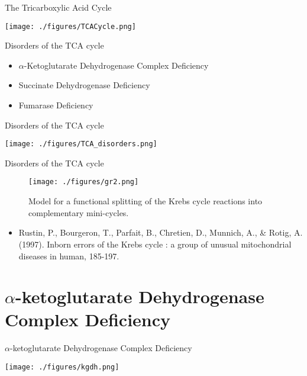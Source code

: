 \documentclass[presentation, smaller]{beamer}
\begin{document}
\begin{frame}[label={sec:org8dd6560}]{The Tricarboxylic Acid Cycle}
\begin{center}
\texttt{[image: ./figures/TCACycle.png]}
\end{center}

\centering
\tiny
{}
\end{frame}

\begin{frame}[label={sec:orgdf7a804}]{Disorders of the TCA cycle}
\begin{itemize}
\item \(\alpha\)-Ketoglutarate Dehydrogenase Complex Deficiency
\item Succinate Dehydrogenase Deficiency
\item Fumarase Deficiency
\end{itemize}
\end{frame}

\begin{frame}[label={sec:org1478622}]{Disorders of the TCA cycle}
\begin{center}
\texttt{[image: ./figures/TCA\_disorders.png]}
\end{center}
\end{frame}


\begin{frame}[label={sec:org9564000}]{Disorders of the TCA cycle}
\begin{figure}[htbp]
\centering
\texttt{[image: ./figures/gr2.png]}
\caption{Model for a functional splitting of the Krebs cycle reactions into complementary mini-cycles.}
\end{figure}

\begin{itemize}
\item Rustin, P., Bourgeron, T., Parfait, B., Chretien, D., Munnich, A., \&
Rotig, A. (1997). Inborn errors of the Krebs cycle : a group of
unusual mitochondrial diseases in human, 185-197.
\end{itemize}
\end{frame}

\section{\(\alpha\)-ketoglutarate Dehydrogenase Complex Deficiency}
\label{sec:orgb116d04}
\begin{frame}[label={sec:org855b4c6}]{\(\alpha\)-ketoglutarate Dehydrogenase Complex Deficiency}
\begin{center}
\texttt{[image: ./figures/kgdh.png]}
\end{center}
\end{frame}
\end{document}
